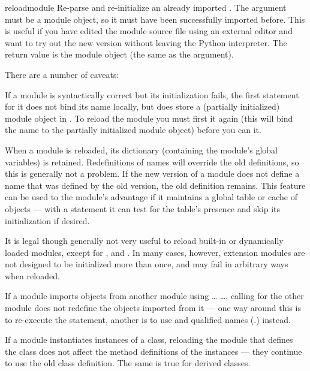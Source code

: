 \begin{funcdesc}{reload}{module}
  Re-parse and re-initialize an already imported .  The
  argument must be a module object, so it must have been successfully
  imported before.  This is useful if you have edited the module
  source file using an external editor and want to try out the new
  version without leaving the Python interpreter.  The return value is
  the module object (the same as the  argument).

  There are a number of caveats:

  If a module is syntactically correct but its initialization fails,
  the first  statement for it does not bind its name
  locally, but does store a (partially initialized) module object in
  .  To reload the module you must first
   it again (this will bind the name to the partially
  initialized module object) before you can  it.

  When a module is reloaded, its dictionary (containing the module's
  global variables) is retained.  Redefinitions of names will override
  the old definitions, so this is generally not a problem.  If the new
  version of a module does not define a name that was defined by the
  old version, the old definition remains.  This feature can be used
  to the module's advantage if it maintains a global table or cache of
  objects --- with a  statement it can test for the
  table's presence and skip its initialization if desired.

  It is legal though generally not very useful to reload built-in or
  dynamically loaded modules, except for ,
   and .  In
  many cases, however, extension modules are not designed to be
  initialized more than once, and may fail in arbitrary ways when
  reloaded.

  If a module imports objects from another module using 
  \ldots{}  \ldots{}, calling  for
  the other module does not redefine the objects imported from it ---
  one way around this is to re-execute the  statement,
  another is to use  and qualified names
  (.) instead.

  If a module instantiates instances of a class, reloading the module
  that defines the class does not affect the method definitions of the
  instances --- they continue to use the old class definition.  The
  same is true for derived classes.
\end{funcdesc}

